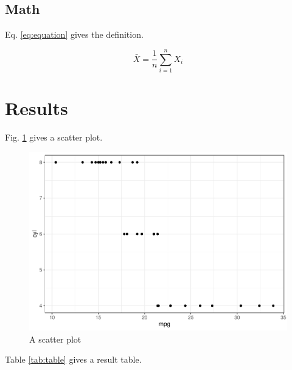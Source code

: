 \documentclass[]{elsarticle} %
\begin{document}
\hypertarget{math}{%
\subsection{Math}\label{math}}

Eq. \eqref{eq:equation} gives the definition.

\begin{equation}
  \bar{X}=\frac{1}{n}\sum_{i=1}^nX_i
  \label{eq:equation}
\end{equation}

\hypertarget{results}{%
\section{Results}\label{results}}

Fig. \ref{fig:plot} gives a scatter plot.

\begin{figure}[!htb]

{\centering \includegraphics[width=1\linewidth]{figuresplot-1} 

}

\caption{A scatter plot}\label{fig:plot}
\end{figure}

Table \ref{tab:table} gives a result table.
\end{document}
